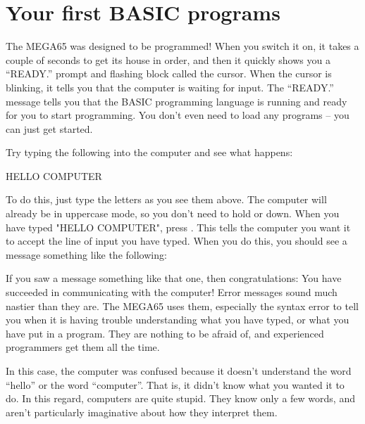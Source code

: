 \section{Your first BASIC programs}

The MEGA65 was designed to be programmed! When you switch it on,
it takes a couple of seconds to get its house in order, and then
it quickly shows you a ``READY.'' prompt and flashing block called
the cursor.  When the cursor is blinking, it tells you that the
computer is waiting for input.  The ``READY.'' message tells you
that the BASIC programming language is running and ready for you to
start programming.  You don't even need to load any programs --
you can just get started.

\needspace{4cm} %
Try typing the following into the computer and see what happens:

\begin{screenoutput}
HELLO COMPUTER
\end{screenoutput}

\needspace{4cm} %

To do this, just type the letters as you see them above.  The computer
will already be in uppercase mode, so you don't need to hold 
or  down.  When you have typed "HELLO COMPUTER", press
  .  This tells the computer you want it to accept the
  line of input you have typed.  When you do this, you should see a message something
  like the following:


  If you saw a  message something like that one, then congratulations:
  You have succeeded in communicating with the computer!
  Error messages sound much nastier than they are.  The MEGA65 uses them, especially
  the syntax error to tell you when it is having trouble understanding what you have
  typed, or what you have put in a program.  They are nothing to be afraid of, and
  experienced programmers get them all the time.

  In this case, the computer was confused because it doesn't understand the word
  ``hello'' or the word ``computer''.  That is, it didn't know what you wanted it to
  do.  In this regard, computers are quite stupid. They know only a few words, and
  aren't particularly imaginative about how they interpret them.


